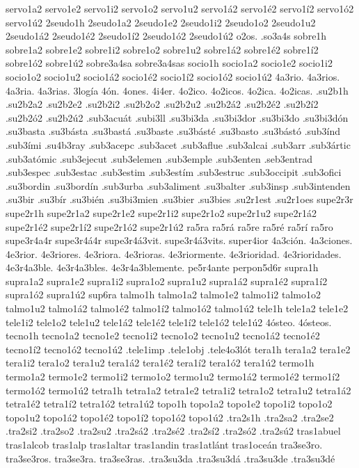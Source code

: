{servo1a2 servo1e2 servo1i2 servo1o2 servo1u2
servo1á2 servo1é2 servo1í2 servo1ó2 servo1ú2
2seudo1h
2seudo1a2 2seudo1e2 2seudo1i2 2seudo1o2 2seudo1u2
2seudo1á2 2seudo1é2 2seudo1í2 2seudo1ó2 2seudo1ú2
o2os.
.so3a4s
sobre1h
sobre1a2 sobre1e2 sobre1i2 sobre1o2 sobre1u2
sobre1á2 sobre1é2 sobre1í2 sobre1ó2 sobre1ú2
sobre3a4sa
sobre3a4sas
socio1h
socio1a2 socio1e2 socio1i2 socio1o2 socio1u2
socio1á2 socio1é2 socio1í2 socio1ó2 socio1ú2
4a3rio.
4a3rios.
4a3ria.
4a3rias.
3logía
4ón.
4ones.
4i4er.
4o2ico.
4o2icos.
4o2ica.
4o2icas.
.su2b1h
.su2b2a2 .su2b2e2 .su2b2i2 .su2b2o2 .su2b2u2
.su2b2á2 .su2b2é2 .su2b2í2 .su2b2ó2 .su2b2ú2
.sub3acuát
.subi3ll
.su3bi3da
.su3bi3dor
.su3bi3do
.su3bi3dón
.su3basta
.su3básta
.su3bastá
.su3baste
.su3básté
.su3basto
.su3bástó
.sub3índ
.sub3ími
.su4b3ray
.sub3acepc
.sub3acet
.sub3aflue
.sub3alcai
.sub3arr
.sub3ártic
.sub3atómic
.sub3ejecut
.sub3elemen
.sub3emple
.sub3enten
.seb3entrad
.sub3espec
.sub3estac
.sub3estim
.sub3estím
.sub3estruc
.sub3occipit
.sub3ofici
.su3bordin
.su3bordín
.sub3urba
.sub3aliment
.su3balter
.sub3insp
.sub3intenden
.su3bir
.su3bír
.su3bién
.su3bi3mien
.su3bier
.su3bies
.su2r1est
.su2r1oes
supe2r3r
supe2r1h
supe2r1a2 supe2r1e2 supe2r1i2 supe2r1o2 supe2r1u2
supe2r1á2 supe2r1é2 supe2r1í2 supe2r1ó2 supe2r1ú2
ra5ra
ra5rá
ra5re
ra5ré
ra5rí
ra5ro
supe3r4a4r
supe3r4á4r
supe3r4á3vit.
supe3r4á3vits.
super4ior
4a3ción.
4a3ciones.
4e3rior.
4e3riores.
4e3riora.
4e3rioras.
4e3riormente.
4e3rioridad.
4e3rioridades.
4e3r4a3ble.
4e3r4a3bles.
4e3r4a3blemente.
pe5r4ante
perpon5d6r
supra1h
supra1a2 supra1e2 supra1i2 supra1o2 supra1u2
supra1á2 supra1é2 supra1í2 supra1ó2 supra1ú2
sup6ra
talmo1h
talmo1a2 talmo1e2 talmo1i2 talmo1o2 talmo1u2
talmo1á2 talmo1é2 talmo1í2 talmo1ó2 talmo1ú2
tele1h
tele1a2 tele1e2 tele1i2 tele1o2 tele1u2
tele1á2 tele1é2 tele1í2 tele1ó2 tele1ú2
4ósteo.
4ósteos.
tecno1h
tecno1a2 tecno1e2 tecno1i2 tecno1o2 tecno1u2
tecno1á2 tecno1é2 tecno1í2 tecno1ó2 tecno1ú2
.tele1imp
.tele1obj
.tele4o3lót
tera1h
tera1a2 tera1e2 tera1i2 tera1o2 tera1u2
tera1á2 tera1é2 tera1í2 tera1ó2 tera1ú2
termo1h
termo1a2 termo1e2 termo1i2 termo1o2 termo1u2
termo1á2 termo1é2 termo1í2 termo1ó2 termo1ú2
tetra1h
tetra1a2 tetra1e2 tetra1i2 tetra1o2 tetra1u2
tetra1á2 tetra1é2 tetra1í2 tetra1ó2 tetra1ú2
topo1h
topo1a2 topo1e2 topo1i2 topo1o2 topo1u2
topo1á2 topo1é2 topo1í2 topo1ó2 topo1ú2
.tra2s1h
.tra2sa2 .tra2se2 .tra2si2 .tra2so2 .tra2su2
.tra2sá2 .tra2sé2 .tra2sí2 .tra2só2 .tra2sú2
tras1abuel
tras1alcob
tras1alp
tras1altar
tras1andin
tras1atlánt
tras1oceán
tra3se3ro.
tra3se3ros.
tra3se3ra.
tra3se3ras.
.tra3su3da
.tra3su3dá
.tra3su3de
.tra3su3dé
}
